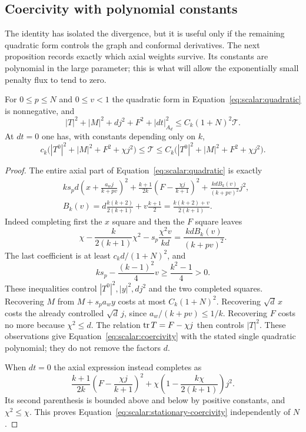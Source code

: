\subsection{Coercivity with polynomial constants}

The identity has isolated the divergence, but it is useful only if the
remaining quadratic form controls the graph and conformal derivatives.
The next proposition records exactly which axial weights survive. Its
constants are polynomial in the large parameter; this is what will allow
the exponentially small penalty flux to tend to zero.


\begin{proposition}\label{prop:scalar:coercivity}
For $0\leq p\leq N$ and $0\leq v<1$ the quadratic form in
Equation~\eqref{eq:scalar:quadratic} is nonnegative, and
\begin{equation}
 |T|^2+|M|^2+d j^2+F^2+|dt|_{A_d}^2
                 \leq C_k(1+N)^2\mathcal T.
 \label{eq:scalar:coercivity}
\end{equation}
At $dt=0$ one has, with constants depending only on $k$,
\begin{equation}
 c_k\bigl(|T^0|^2+|M|^2+F^2+\chi j^2\bigr)
 \leq\mathcal T\leq
 C_k\bigl(|T^0|^2+|M|^2+F^2+\chi j^2\bigr).
 \label{eq:scalar:stationary-coercivity}
\end{equation}
\end{proposition}

\begin{proof}
The entire axial part of Equation~\eqref{eq:scalar:quadratic} is
exactly
\begin{equation}
 \begin{aligned}
 &ks_pd\left(x+\frac{a_wj}{k+pv}\right)^2
 +\frac{k+1}{2k}\left(F-\frac{\chi j}{k+1}\right)^2
 +\frac{kd B_k(v)}{(k+pv)^2}j^2,\\
 &B_k(v)=d\frac{k(k+2)}{2(k+1)}+v\frac{k+1}{2}
        =\frac{k(k+2)+v}{2(k+1)}.
 \end{aligned}
 \label{eq:scalar:completed-axial}
\end{equation}
Indeed completing first the $x$ square and then the $F$ square leaves
\[
 \chi-\frac{k}{2(k+1)}\chi^2
             -s_p\frac{\chi^2v}{kd}
       =\frac{kd B_k(v)}{(k+pv)^2}.
\]
The last coefficient is at least $c_kd/(1+N)^2$, and
\[
 ks_p-\frac{(k-1)^2}{4}v\geq\frac{k^2-1}{4}>0.
\]
These inequalities control $|T^0|^2,|y|^2,dj^2$ and the two completed
squares.  Recovering $M$ from $M+s_pa_wy$ costs at most
$C_k(1+N)^2$.  Recovering $\sqrt d\,x$ costs the already controlled
$\sqrt d\,j$, since $a_w/(k+pv)\leq1/k$.  Recovering $F$ costs no
more because $\chi^2\leq d$.  The relation $\operatorname{tr} T=F-\chi j$ then
controls $|T|^2$.  These observations give
Equation~\eqref{eq:scalar:coercivity} with the stated single quadratic
polynomial; they do not remove the factors $d$.

When $dt=0$ the axial expression instead completes as
\[
 \frac{k+1}{2k}\left(F-\frac{\chi j}{k+1}\right)^2
       +\chi\left(1-\frac{k\chi}{2(k+1)}\right)j^2.
\]
Its second parenthesis is bounded above and below by positive
constants, and $\chi^2\leq\chi$.  This proves
Equation~\eqref{eq:scalar:stationary-coercivity} independently of $N$.
\end{proof}

